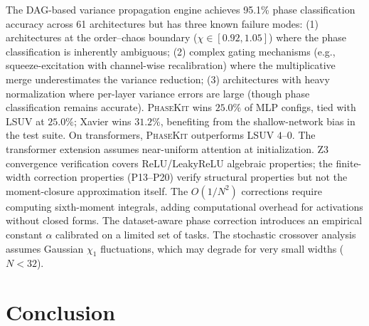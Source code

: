 \documentclass[10pt]{article}
\newcommand{\ToolName}{\textsc{PhaseKit}}
\begin{document}
The DAG-based variance propagation engine achieves 95.1\% phase classification accuracy across 61 architectures but has three known failure modes: (1) architectures at the order--chaos boundary ($\chi \in [0.92, 1.05]$) where the phase classification is inherently ambiguous; (2) complex gating mechanisms (e.g., squeeze-excitation with channel-wise recalibration) where the multiplicative merge underestimates the variance reduction; (3) architectures with heavy normalization where per-layer variance errors are large (though phase classification remains accurate).
\ToolName{} wins $25.0\%$ of MLP configs, tied with LSUV at $25.0\%$; Xavier wins $31.2\%$, benefiting from the shallow-network bias in the test suite.
On transformers, \ToolName{} outperforms LSUV $4$--$0$.
The transformer extension assumes near-uniform attention at initialization.
Z3 convergence verification covers ReLU/LeakyReLU algebraic properties; the finite-width correction properties (P13--P20) verify structural properties but not the moment-closure approximation itself.
The $O(1/N^2)$ corrections require computing sixth-moment integrals, adding computational overhead for activations without closed forms.
The dataset-aware phase correction introduces an empirical constant $\alpha$ calibrated on a limited set of tasks.
The stochastic crossover analysis assumes Gaussian $\chi_1$ fluctuations, which may degrade for very small widths ($N < 32$).

\section{Conclusion}
\label{sec:conclusion}
\end{document}
